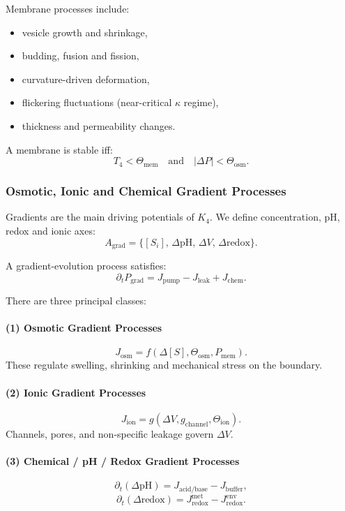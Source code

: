 Membrane processes include:
\begin{itemize}
    \item vesicle growth and shrinkage,
    \item budding, fusion and fission,
    \item curvature-driven deformation,
    \item flickering fluctuations (near-critical $\kappa$ regime),
    \item thickness and permeability changes.
\end{itemize}

A membrane is stable iff:
\[
T_4 < \Theta_{\text{mem}} \quad\text{and}\quad
|\Delta P| < \Theta_{\text{osm}}.
\]

\subsubsection{Osmotic, Ionic and Chemical Gradient Processes}

Gradients are the main driving potentials of $K_4$.
We define concentration, pH, redox and ionic axes:
\[
A_\text{grad} = \{[S_i],\, \Delta \text{pH},\, \Delta V,\, \Delta \text{redox}\}.
\]

A gradient-evolution process satisfies:
\[
\partial_t P_\text{grad} =
    J_{\text{pump}} - J_{\text{leak}} + J_{\text{chem}}.
\]

There are three principal classes:

\paragraph{(1) Osmotic Gradient Processes}
\[
J_{\text{osm}} = f(\Delta [S], \Theta_{\text{osm}}, P_\text{mem}).
\]
These regulate swelling, shrinking and mechanical stress on the boundary.

\paragraph{(2) Ionic Gradient Processes}
\[
J_{\text{ion}} = g(\Delta V, g_{\text{channel}}, \Theta_{\text{ion}}).
\]
Channels, pores, and non-specific leakage govern $\Delta V$.

\paragraph{(3) Chemical / pH / Redox Gradient Processes}
\[
\partial_t (\Delta \text{pH}) = J_{\text{acid/base}}
    - J_{\text{buffer}},
\]
\[
\partial_t (\Delta \text{redox}) = J_{\text{redox}}^{\text{met}}
    - J_{\text{redox}}^{\text{env}}.
\]

